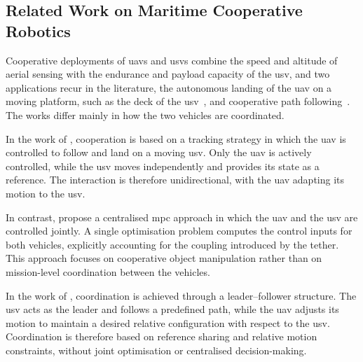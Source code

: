 \subsection{Related Work on Maritime Cooperative Robotics}
\label{subsec:sota_coop_related}
Cooperative deployments of \glspl{uav} and \glspl{usv} combine the speed and altitude of aerial sensing with the endurance and payload capacity of the \gls{usv}, and two applications recur in the literature, the autonomous landing of the \gls{uav} on a moving platform, such as the deck of the \gls{usv}~\cite{serraLandingQuadrotorMoving2016,liNMPCbasedUAVUSVCooperative2023}, and cooperative path following~\cite{zhangCooperativeControlFramework2025}. The works differ mainly in how the two vehicles are coordinated.

In the work of \citet{liNMPCbasedUAVUSVCooperative2023}, cooperation is based on a tracking strategy in which the \gls{uav} is controlled to follow and land on a moving \gls{usv}. Only the \gls{uav} is actively controlled, while the \gls{usv} moves independently and provides its state as a reference. The interaction is therefore unidirectional, with the \gls{uav} adapting its motion to the \gls{usv}.

In contrast, \citet{novakCollaborativeObjectManipulation2024} propose a centralised \gls{mpc} approach in which the \gls{uav} and the \gls{usv} are controlled jointly. A single optimisation problem computes the control inputs for both vehicles, explicitly accounting for the coupling introduced by the tether. This approach focuses on cooperative object manipulation rather than on mission-level coordination between the vehicles.

In the work of \citet{zhangCooperativeControlFramework2025}, coordination is achieved through a leader--follower structure. The \gls{usv} acts as the leader and follows a predefined path, while the \gls{uav} adjusts its motion to maintain a desired relative configuration with respect to the \gls{usv}. Coordination is therefore based on reference sharing and relative motion constraints, without joint optimisation or centralised decision-making.
